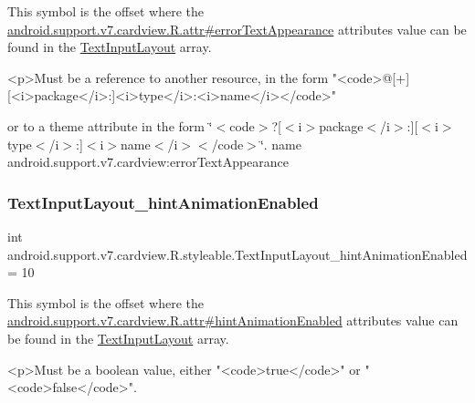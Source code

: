 This symbol is the offset where the \hyperlink{classandroid_1_1support_1_1v7_1_1cardview_1_1R_1_1attr_aa24f76b658731325f150e64ac38b5ce6}{android.\+support.\+v7.\+cardview.\+R.\+attr\#error\+Text\+Appearance} attribute\textquotesingle{}s value can be found in the \hyperlink{classandroid_1_1support_1_1v7_1_1cardview_1_1R_1_1styleable_a9b23c31ffaf354f0f5cc4b82392ef6a4}{Text\+Input\+Layout} array.

\begin{DoxyVerb}      <p>Must be a reference to another resource, in the form "<code>@[+][<i>package</i>:]<i>type</i>:<i>name</i></code>"
\end{DoxyVerb}
 or to a theme attribute in the form \char`\"{}$<$code$>$?\mbox{[}$<$i$>$package$<$/i$>$\+:\mbox{]}\mbox{[}$<$i$>$type$<$/i$>$\+:\mbox{]}$<$i$>$name$<$/i$>$$<$/code$>$\char`\"{}.  name android.\+support.\+v7.\+cardview\+:error\+Text\+Appearance \mbox{\label{classandroid_1_1support_1_1v7_1_1cardview_1_1R_1_1styleable_a421879524a0afb79c7396b3d0a1e6e7e}} 
\subsubsection{\texorpdfstring{Text\+Input\+Layout\+\_\+hint\+Animation\+Enabled}{TextInputLayout\_hintAnimationEnabled}}
{\footnotesize\ttfamily int android.\+support.\+v7.\+cardview.\+R.\+styleable.\+Text\+Input\+Layout\+\_\+hint\+Animation\+Enabled = 10\hspace{0.3cm}{\ttfamily [static]}}

This symbol is the offset where the \hyperlink{classandroid_1_1support_1_1v7_1_1cardview_1_1R_1_1attr_a9a1dcb3b4d6c2da9c92a7c45799fc559}{android.\+support.\+v7.\+cardview.\+R.\+attr\#hint\+Animation\+Enabled} attribute\textquotesingle{}s value can be found in the \hyperlink{classandroid_1_1support_1_1v7_1_1cardview_1_1R_1_1styleable_a9b23c31ffaf354f0f5cc4b82392ef6a4}{Text\+Input\+Layout} array.

\begin{DoxyVerb}      <p>Must be a boolean value, either "<code>true</code>" or "<code>false</code>".
\end{DoxyVerb}
 

